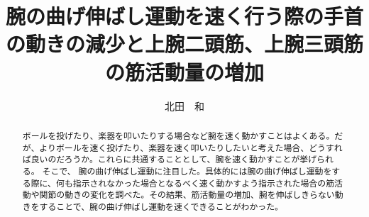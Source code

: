\documentclass{jsarticle}
\title{腕の曲げ伸ばし運動を速く行う際の手首の動きの減少と上腕二頭筋、上腕三頭筋の筋活動量の増加}
\author{北田　和}
\begin{document}
\maketitle


\begin{abstract}

ボールを投げたり、楽器を叩いたりする場合など腕を速く動かすことはよくある。だが、よりボールを速く投げたり、楽器を速く叩いたりしたいと考えた場合、どうすれば良いのだろうか。これらに共通することとして、腕を速く動かすことが挙げられる。
そこで、
腕の曲げ伸ばし運動に注目した。具体的には腕の曲げ伸ばし運動をする際に、何も指示されなかった場合となるべく速く動かすよう指示された場合の筋活動や関節の動きの変化を調べた。その結果、筋活動量の増加、腕を伸ばしきらない動きをすることで、腕の曲げ伸ばし運動を速くできることがわかった。
\end{abstract}
\end{document}

